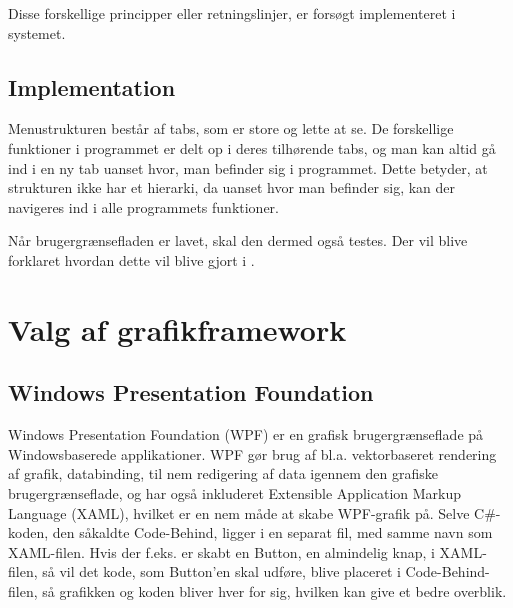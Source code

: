 Disse forskellige principper eller retningslinjer, er forsøgt implementeret i systemet.


\subsection{Implementation}\label{sec:Implementation}

Menustrukturen består af tabs, som er store og lette at se.
De forskellige funktioner i programmet er delt op i deres tilhørende tabs, og man kan altid gå ind i en ny tab uanset hvor, man befinder sig i programmet. 
Dette betyder, at strukturen ikke har et hierarki, da uanset hvor man befinder sig, kan der navigeres ind i alle programmets funktioner.

Når brugergrænsefladen er lavet, skal den dermed også testes. 
Der vil blive forklaret hvordan dette vil blive gjort i .
\section{Valg af grafikframework} 
\subsection{Windows Presentation Foundation}
Windows Presentation Foundation (WPF) er en grafisk brugergrænseflade på Windowsbaserede applikationer.  
WPF gør brug af  bl.a. vektorbaseret rendering af grafik, databinding, til nem redigering af data igennem den grafiske brugergrænseflade, og har også inkluderet Extensible Application Markup Language (XAML), hvilket er en nem måde at skabe WPF-grafik på. 
Selve C\#-koden, den såkaldte Code-Behind, ligger i en separat fil, med samme navn som XAML-filen. 
Hvis der f.eks. er skabt en Button, en almindelig knap, i XAML-filen, så vil det kode, som Button'en skal udføre, blive placeret i Code-Behind-filen, så grafikken og koden bliver hver for sig, hvilken kan give et bedre overblik. \citep{wpf} 

